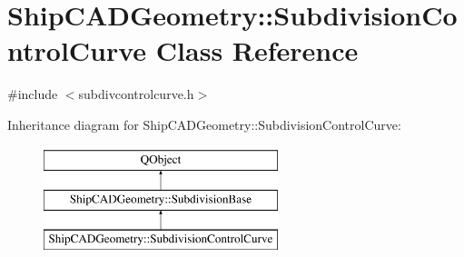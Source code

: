\hypertarget{classShipCADGeometry_1_1SubdivisionControlCurve}{\section{Ship\-C\-A\-D\-Geometry\-:\-:Subdivision\-Control\-Curve Class Reference}
\label{classShipCADGeometry_1_1SubdivisionControlCurve}
}


{\ttfamily \#include $<$subdivcontrolcurve.\-h$>$}

Inheritance diagram for Ship\-C\-A\-D\-Geometry\-:\-:Subdivision\-Control\-Curve\-:\begin{figure}[H]
\begin{center}
\leavevmode
\includegraphics[height=3.000000cm]{classShipCADGeometry_1_1SubdivisionControlCurve}
\end{center}
\end{figure}
